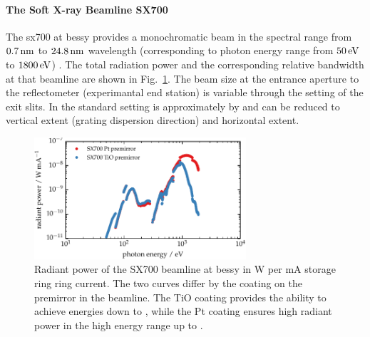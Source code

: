 \paragraph{The Soft X-ray Beamline SX700}
The \gls{sx700} at \gls{bessy} provides a monochromatic beam in the spectral range from $\nm{0.7}$ to $\nm{24.8}$ wavelength (corresponding to photon energy range from $\ev{50}$ to $\ev{1800}$) \cite{beckhoff_quarter-century_2009}. The total radiation power and the corresponding relative bandwidth at that beamline are shown in Fig.~\ref{ch_exp:fig_flux_sx700}. The beam size at the entrance aperture to the reflectometer (experimantal end station) is variable through the setting of the exit slits. In the standard setting is approximately  by  \cite{scholze_high-accuracy_2001} and can be reduced to  vertical extent (grating dispersion direction) and  horizontal extent.
\begin{figure}[htb]
    \includegraphics[width=0.7\textwidth]{img/beamline_radiant_power.pdf}
    \caption[Radiant power of the SX700 beamline.]{Radiant power of the SX700 beamline at \gls{bessy} in W per mA storage ring ring current. The two curves differ by the coating on the premirror in the beamline. The TiO coating provides the ability to achieve energies down to , while the Pt coating ensures high radiant power in the high energy range up to .}
    \label{ch_exp:fig_flux_sx700}
\end{figure}

